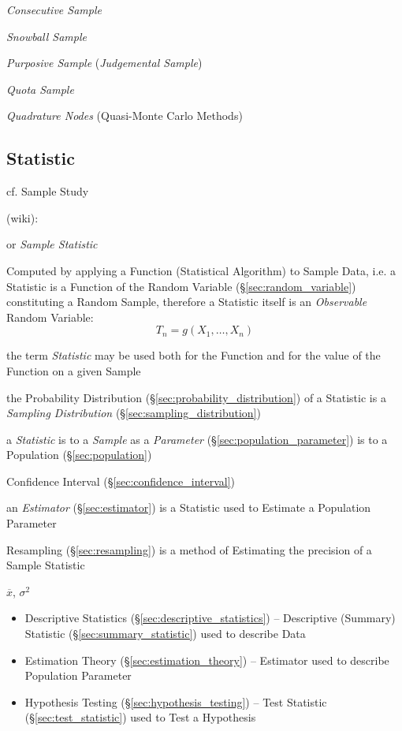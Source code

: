 \emph{Consecutive Sample}

\emph{Snowball Sample}

\emph{Purposive Sample} (\emph{Judgemental Sample})

\emph{Quota Sample}

\emph{Quadrature Nodes} (Quasi-Monte Carlo Methods) %



\subsection{Statistic}\label{sec:statistic}

cf. Sample Study

(wiki):

or \emph{Sample Statistic}

Computed by applying a Function (Statistical Algorithm) to Sample Data, i.e. a
Statistic is a Function of the Random Variable (\S\ref{sec:random_variable})
constituting a Random Sample, therefore a Statistic itself is an
\emph{Observable} Random Variable:
\[
  T_n = g(X_1, \ldots, X_n)
\]

the term \emph{Statistic} may be used both for the Function and for the value of
the Function on a given Sample

the Probability Distribution (\S\ref{sec:probability_distribution}) of a
Statistic is a \emph{Sampling Distribution} (\S\ref{sec:sampling_distribution})

a \emph{Statistic} is to a \emph{Sample} as a \emph{Parameter}
(\S\ref{sec:population_parameter}) is to a Population (\S\ref{sec:population})

Confidence Interval (\S\ref{sec:confidence_interval})

\fist an \emph{Estimator} (\S\ref{sec:estimator}) is a Statistic used to
Estimate a Population Parameter

\fist Resampling (\S\ref{sec:resampling}) is a method of Estimating the
precision of a Sample Statistic

$\overline{x}$, $\sigma^2$

\begin{itemize}
  \item Descriptive Statistics (\S\ref{sec:descriptive_statistics}) --
    Descriptive (Summary) Statistic (\S\ref{sec:summary_statistic}) used to
    describe Data
  \item Estimation Theory (\S\ref{sec:estimation_theory}) -- Estimator used to
    describe Population Parameter
  \item Hypothesis Testing (\S\ref{sec:hypothesis_testing}) -- Test Statistic
    (\S\ref{sec:test_statistic}) used to Test a Hypothesis
\end{itemize}

